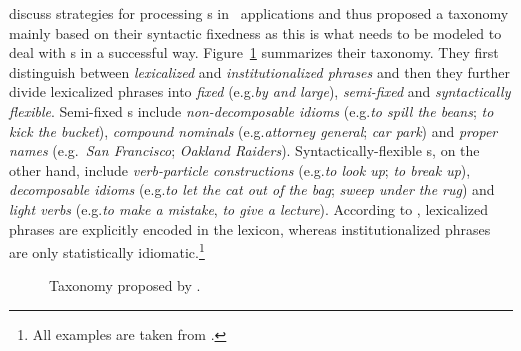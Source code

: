 \documentclass[output=paper]{langsci/langscibook}
\begin{document}
\citet{Sag:2002} discuss strategies for processing \mwe s in \nlp\ applications and thus proposed a taxonomy mainly based on their syntactic fixedness as this is what needs to be modeled to deal with \mwe s in a successful way.
Figure~\ref{fig:Sag_taxonomy} summarizes their taxonomy.
They first distinguish between \textit{lexicalized} and \textit{institutionalized phrases} and then they further divide lexicalized phrases into \textit{fixed} (e.g.\@f \textit{by and large}), \textit{semi-fixed} and \textit{syntactically flexible}. 
Semi-fixed \mwe s include \textit{non-decomposable idioms} (e.g.\@ \textit{to spill the beans}; \textit{to kick the bucket}), \textit{compound nominals} 
(e.g.\@ \textit{attorney general}; \textit{car park}) and \textit{proper names} (e.g.~\textit{San Francisco}; \textit{Oakland Raiders}).
Syntactically-flexible \mwe s, on the other hand, include \textit{verb-particle constructions} (e.g.\@ \textit{to look up}; \textit{to break up}), \textit{decomposable idioms} (e.g.\@ \textit{to let the cat out of the bag}; \textit{sweep under the rug}) and \textit{light verbs} (e.g.\@ \textit{to make a mistake}, \textit{to give a lecture}). 
According to \citet{Sag:2002}, lexicalized phrases are explicitly encoded in the lexicon, whereas institutionalized phrases are only statistically idiomatic.\footnote{All examples are taken from \citet{Sag:2002}.} 

\begin{figure}[h]
\centering
{}
\caption{Taxonomy proposed by \citet{Sag:2002}.}
\label{fig:Sag_taxonomy}
\end{figure}
\end{document}
